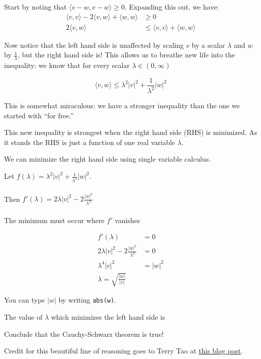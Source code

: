\documentclass{ximera}
\begin{document}
\begin{question}
  Start by noting that $\langle v-w,v-w\rangle \geq 0 $.  Expanding this out, we have:
  \begin{align*}
  \langle v,v \rangle - 2 \langle v,w \rangle +\langle  w,w\rangle &\geq 0 \\
  2\langle v,w \rangle &\leq \langle v,v \rangle  + \langle w,w\rangle
  \end{align*}
  
  Now notice that the left hand side is unaffected by scaling $v$ by a scalar $\lambda$ and $w$ by $\frac{1}{\lambda}$, but the right hand side is!
  This allows us to breathe new life into the inequality:  we know that for every scalar $\lambda \in (0,\infty)$ 
  
  \[
  \langle  v,w \rangle \leq \lambda^2 |v|^2 + \frac{1}{\lambda^2} |w|^2
  \] 
  
  This is somewhat miraculous:  we have a stronger inequality than the one we started with ``for free.''
  
  This new inequality is strongest when the right hand side (RHS) is minimized.  As it stands the RHS is just a function of one real variable $\lambda$.
  
  \begin{solution}
    \begin{hint}
      We can minimize the right hand side using single variable calculus.
    \end{hint}
    \begin{hint}
      Let $f(\lambda) = \lambda^2 |v|^2 + \frac{1}{\lambda^2} |w|^2$.
     \\
     \\
      Then $f'(\lambda) = 2\lambda |v|^2 -2\frac{|w|^2}{\lambda^3}$
      \\
      \\
      The minimum must occur where $f'$ vanishes
    \end{hint}
    \begin{hint}
      \begin{align*}
        f'(\lambda) &= 0\\
        2\lambda |v|^2 -2\frac{|w|^2}{\lambda^3} &= 0\\
        \lambda^4 |v|^2 &=|w|^2\\
        \lambda = \sqrt{\frac{|w|}{|v|}}
      \end{align*}
    \end{hint}
    \begin{hint}
      You can type $|w|$ by writing \verb|abs(w)|.
    \end{hint}
    The value of $\lambda$ which minimizes the left hand side is 	
  \end{solution}
  
  Conclude that the Cauchy-Schwarz theorem is true!
  
  Credit for this beautiful line of reasoning goes to Terry Tao at 
  \href{https://terrytao.wordpress.com/2007/09/05/amplification-arbitrage-and-the-tensor-power-trick/}{this blog post}.
  
\end{question}
\end{document}
